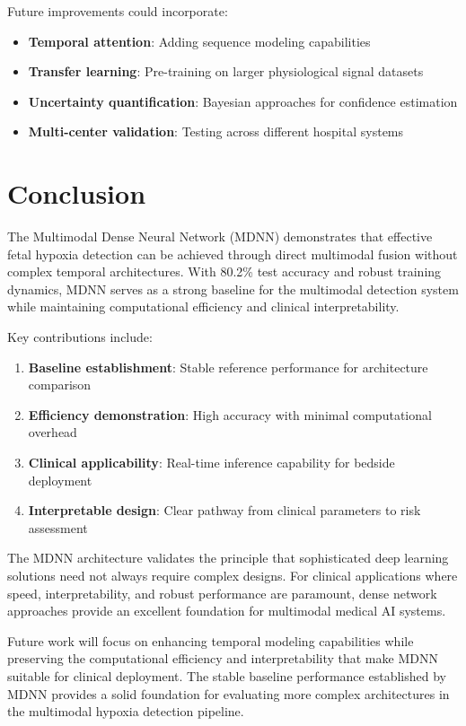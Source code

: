 \documentclass[12pt,a4paper]{article}
\begin{document}
Future improvements could incorporate:

\begin{itemize}
    \item \textbf{Temporal attention}: Adding sequence modeling capabilities
    \item \textbf{Transfer learning}: Pre-training on larger physiological signal datasets
    \item \textbf{Uncertainty quantification}: Bayesian approaches for confidence estimation
    \item \textbf{Multi-center validation}: Testing across different hospital systems
\end{itemize}

\section{Conclusion}

The Multimodal Dense Neural Network (MDNN) demonstrates that effective fetal hypoxia detection can be achieved through direct multimodal fusion without complex temporal architectures. With 80.2\% test accuracy and robust training dynamics, MDNN serves as a strong baseline for the multimodal detection system while maintaining computational efficiency and clinical interpretability.

Key contributions include:

\begin{enumerate}
    \item \textbf{Baseline establishment}: Stable reference performance for architecture comparison
    \item \textbf{Efficiency demonstration}: High accuracy with minimal computational overhead
    \item \textbf{Clinical applicability}: Real-time inference capability for bedside deployment
    \item \textbf{Interpretable design}: Clear pathway from clinical parameters to risk assessment
\end{enumerate}

The MDNN architecture validates the principle that sophisticated deep learning solutions need not always require complex designs. For clinical applications where speed, interpretability, and robust performance are paramount, dense network approaches provide an excellent foundation for multimodal medical AI systems.

Future work will focus on enhancing temporal modeling capabilities while preserving the computational efficiency and interpretability that make MDNN suitable for clinical deployment. The stable baseline performance established by MDNN provides a solid foundation for evaluating more complex architectures in the multimodal hypoxia detection pipeline.
\end{document}
